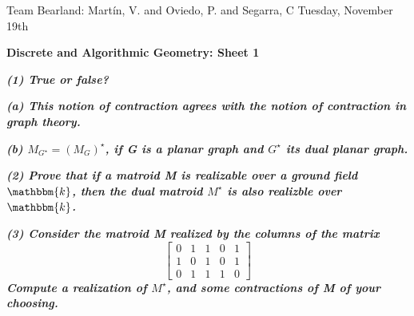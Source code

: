 \documentclass[a4paper, 10pt]{article}
\theoremstyle{definition} %
\begin{document}
Team Bearland: Mart\'in, V. and Oviedo, P. and Segarra, C \hfill Tuesday, November 19th

\vspace{15pt}

\textbf{\Large Discrete and Algorithmic Geometry: Sheet 1}

\vspace{20pt}

\textbf{\textit{(1) True or false?}}

\vspace{3pt}

\hspace{5pt} \textbf{\textit{(a) This notion of contraction agrees with the notion of contraction in graph theory.}}

\vspace{3pt}

\hspace{5pt} \textbf{\textit{(b) $M_{G^\star} = \left(M_G\right)^\star$, if G is a planar graph and $G^\star$ its dual planar graph.}}

\vspace{10pt}

\textbf{\textit{(2) Prove that if a matroid M is realizable over a ground field $\mathbbm{k}$, then the dual matroid $M^\star$ is also realizble over $\mathbbm{k}$.}}

\vspace{10pt}

\textbf{\textit{(3) Consider the matroid M realized by the columns of the matrix}}
$$
\left[
    \begin{array}{ccccc}
        0 & 1 & 1 & 0 & 1 \\
        1 & 0 & 1 & 0 & 1 \\
        0 & 1 & 1 & 1 & 0
    \end{array}
\right]
$$
\textbf{\textit{ Compute a realization of $M^\star$, and some contractions of M of your choosing.}}
\end{document}
